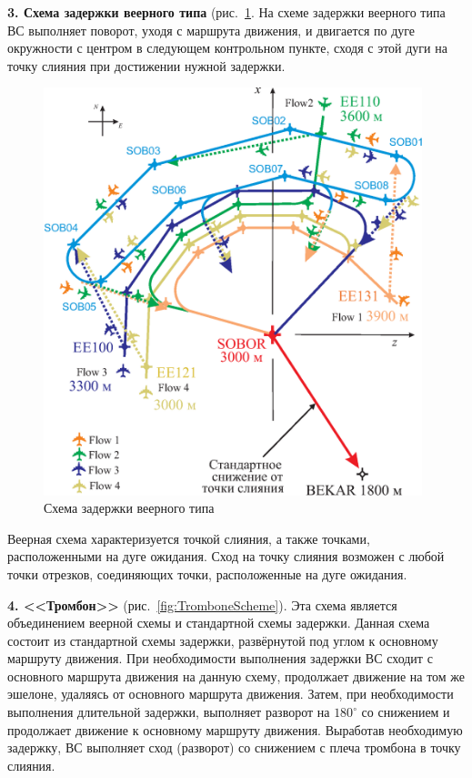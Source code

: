 \documentclass[12pt]{article}
\theoremstyle{plain}
\begin{document}
\textbf{3. Схема задержки веерного типа} (рис.~\ref{fig:VeerScheme}. На схеме задержки веерного типа ВС выполняет поворот, уходя с маршрута движения, и двигается по дуге окружности с центром в следующем контрольном пункте, сходя с этой дуги на точку слияния при достижении нужной задержки. 

\begin{figure}[h]
  \centering

  \includegraphics[width=11cm]{Scheme02_plane.eps}    %

  \caption{Схема задержки веерного типа} 
  \label{fig:VeerScheme}
\end{figure}

Веерная схема характеризуется точкой слияния, а также точками, расположенными на дуге ожидания. Сход на точку слияния возможен с любой точки отрезков, соединяющих точки, расположенные на дуге ожидания.

\textbf{4. <<Тромбон>>} (рис.~\ref{fig:TromboneScheme}). Эта схема является объединением веерной схемы и стандартной схемы задержки. Данная схема состоит из стандартной схемы задержки, развёрнутой под углом к основному маршруту движения. При необходимости выполнения задержки ВС сходит с основного маршрута движения на данную схему, продолжает движение на том же эшелоне, удаляясь от основного маршрута движения. Затем, при необходимости выполнения длительной задержки, выполняет разворот на $180^\circ$ со снижением и продолжает движение к основному маршруту движения. Выработав необходимую задержку, ВС выполняет сход (разворот) со снижением с плеча тромбона в точку слияния. 
\end{document}
